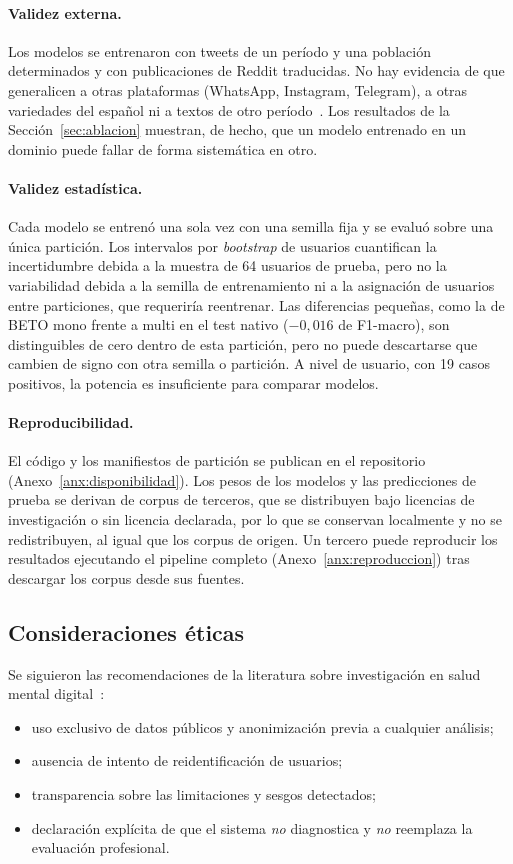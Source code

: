 \documentclass[12pt,a4paper]{article}
\begin{document}
\paragraph{Validez externa.} Los modelos se entrenaron con tweets de un período y una población determinados y con publicaciones de Reddit traducidas. No hay evidencia de que generalicen a otras plataformas (WhatsApp, Instagram, Telegram), a otras variedades del español ni a textos de otro período~\cite{harrigian2020generalize}. Los resultados de la Sección~\ref{sec:ablacion} muestran, de hecho, que un modelo entrenado en un dominio puede fallar de forma sistemática en otro.

\paragraph{Validez estadística.} Cada modelo se entrenó una sola vez con una semilla fija y se evaluó sobre una única partición. Los intervalos por \emph{bootstrap} de usuarios cuantifican la incertidumbre debida a la muestra de 64 usuarios de prueba, pero no la variabilidad debida a la semilla de entrenamiento ni a la asignación de usuarios entre particiones, que requeriría reentrenar. Las diferencias pequeñas, como la de BETO mono frente a multi en el test nativo ($-0{,}016$ de F1-macro), son distinguibles de cero dentro de esta partición, pero no puede descartarse que cambien de signo con otra semilla o partición. A nivel de usuario, con 19 casos positivos, la potencia es insuficiente para comparar modelos.

\paragraph{Reproducibilidad.} El código y los manifiestos de partición se publican en el repositorio (Anexo~\ref{anx:disponibilidad}). Los pesos de los modelos y las predicciones de prueba se derivan de corpus de terceros, que se distribuyen bajo licencias de investigación o sin licencia declarada, por lo que se conservan localmente y no se redistribuyen, al igual que los corpus de origen. Un tercero puede reproducir los resultados ejecutando el pipeline completo (Anexo~\ref{anx:reproduccion}) tras descargar los corpus desde sus fuentes.

\subsection{Consideraciones éticas}
\label{sec:etica}
Se siguieron las recomendaciones de la literatura sobre investigación en salud mental digital~\cite{fisher2025metaanalisis,leis2021tesis}:
\begin{itemize}[leftmargin=2em]
    \item uso exclusivo de datos públicos y anonimización previa a cualquier análisis;
    \item ausencia de intento de reidentificación de usuarios;
    \item transparencia sobre las limitaciones y sesgos detectados;
    \item declaración explícita de que el sistema \emph{no} diagnostica y \emph{no} reemplaza la evaluación profesional.
\end{itemize}
\end{document}
